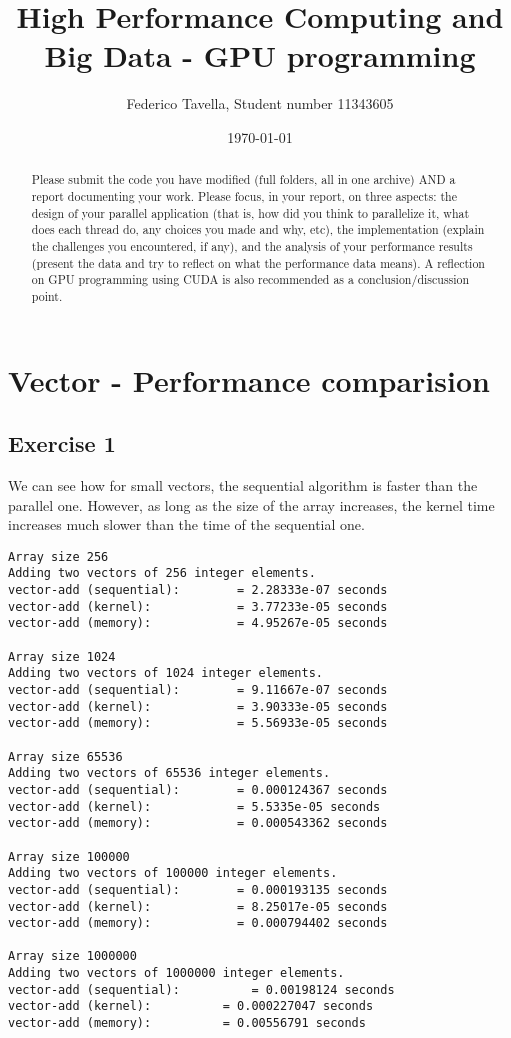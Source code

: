 \documentclass[a4paper]{article}
\title{High Performance Computing and Big Data - GPU programming}
\author{Federico Tavella, Student number 11343605}
\date{\today}
\begin{document}
\maketitle

\begin{abstract}
Please submit the code you have modified (full folders, all in one archive) AND a report documenting your work. Please focus, in your report, on three aspects: the design of your parallel application (that is, how did you think to parallelize it, what does each thread do, any choices you made and why, etc), the implementation (explain the challenges  you encountered, if any), and the analysis of your performance results (present the data and try to reflect on what the performance data means). A reflection on GPU programming using CUDA is also recommended as a conclusion/discussion point. 
\end{abstract}

\section{Vector - Performance comparision}

\subsection{Exercise 1}

We can see how for small vectors, the sequential algorithm is faster than the parallel one. However, as long as the size of the array increases, the kernel time increases much slower than the time of the sequential one.

\begin{verbatim}
Array size 256
Adding two vectors of 256 integer elements.
vector-add (sequential):        = 2.28333e-07 seconds
vector-add (kernel):            = 3.77233e-05 seconds
vector-add (memory):            = 4.95267e-05 seconds

Array size 1024
Adding two vectors of 1024 integer elements.
vector-add (sequential):        = 9.11667e-07 seconds
vector-add (kernel):            = 3.90333e-05 seconds
vector-add (memory):            = 5.56933e-05 seconds

Array size 65536
Adding two vectors of 65536 integer elements.
vector-add (sequential):        = 0.000124367 seconds
vector-add (kernel):            = 5.5335e-05 seconds
vector-add (memory):            = 0.000543362 seconds

Array size 100000
Adding two vectors of 100000 integer elements.
vector-add (sequential):        = 0.000193135 seconds
vector-add (kernel):            = 8.25017e-05 seconds
vector-add (memory):            = 0.000794402 seconds

Array size 1000000
Adding two vectors of 1000000 integer elements.
vector-add (sequential): 		  = 0.00198124 seconds
vector-add (kernel): 		  = 0.000227047 seconds
vector-add (memory): 		  = 0.00556791 seconds
\end{verbatim}
\end{document}
